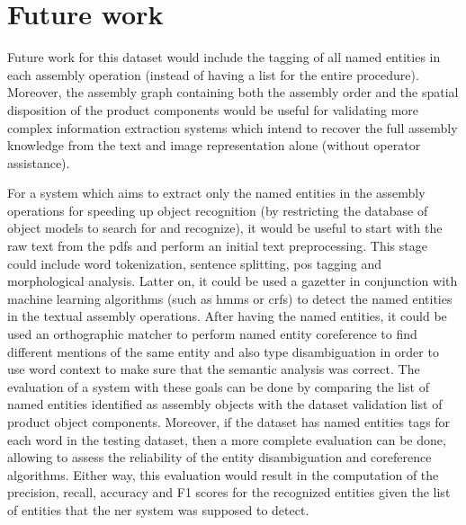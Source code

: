 \section{Future work}\label{sec:future-work}

Future work for this dataset would include the tagging of all named entities in each assembly operation (instead of having a list for the entire procedure). Moreover, the assembly graph containing both the assembly order and the spatial disposition of the product components would be useful for validating more complex information extraction systems which intend to recover the full assembly knowledge from the text and image representation alone (without operator assistance).

For a system which aims to extract only the named entities in the assembly operations for speeding up object recognition (by restricting the database of object models to search for and recognize), it would be useful to start with the raw text from the \glspl{pdf} and perform an initial text preprocessing. This stage could include word tokenization, sentence splitting, \gls{pos} tagging and morphological analysis. Latter on, it could be used a gazetter in conjunction with machine learning algorithms (such as \glspl{hmm} or \glspl{crf}) to detect the named entities in the textual assembly operations. After having the named entities, it could be used an orthographic matcher to perform named entity coreference to find different mentions of the same entity and also type disambiguation in order to use word context to make sure that the semantic analysis was correct. The evaluation of a system with these goals can be done by comparing the list of named entities identified as assembly objects with the dataset validation list of product object components. Moreover, if the dataset has named entities tags for each word in the testing dataset, then a more complete evaluation can be done, allowing to assess the reliability of the entity disambiguation and coreference algorithms. Either way, this evaluation would result in the computation of the precision, recall, accuracy and F1 scores for the recognized entities given the list of entities that the \gls{ner} system was supposed to detect.
